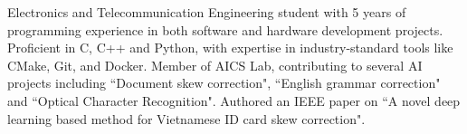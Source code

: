 
\begin{cvparagraph}
  Electronics and Telecommunication Engineering student with 5 years of programming experience in both software and hardware development projects.
  Proficient in C, C++ and Python, with expertise in industry-standard tools like CMake, Git, and Docker.
  Member of AICS Lab, contributing to several AI projects including ``Document skew correction", ``English grammar correction" and ``Optical Character Recognition".
  Authored an IEEE paper on ``A novel deep learning based method for Vietnamese ID card skew correction".


\end{cvparagraph}

